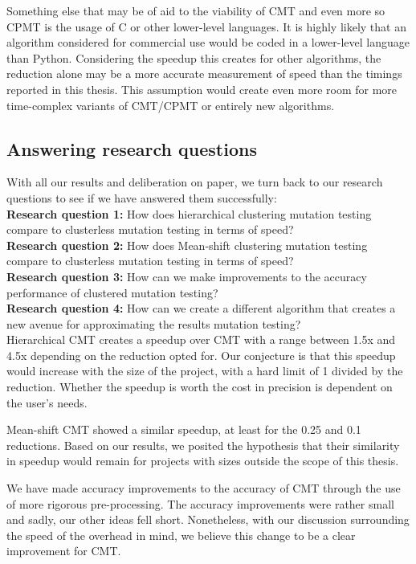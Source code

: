 \documentclass[twoside]{uva-inf-bachelor-thesis}
\begin{document}
Something else that may be of aid to the viability of CMT and even more so CPMT is the usage of C or other lower-level languages. It is highly likely that an algorithm considered for commercial use would be coded in a lower-level language than Python. Considering the speedup this creates for other algorithms, the reduction alone may be a more accurate measurement of speed than the timings reported in this thesis. This assumption would create even more room for more time-complex variants of CMT/CPMT or entirely new algorithms.

\subsection{Answering research questions}
With all our results and deliberation on paper, we turn back to our research questions to see if we have answered them successfully:\\
\textbf{Research question 1:} How does hierarchical clustering mutation testing compare to clusterless mutation testing in terms of speed?\\
\textbf{Research question 2:} How does Mean-shift clustering mutation testing compare to clusterless mutation testing in terms of speed?\\
\textbf{Research question 3:} How can we make improvements to the accuracy performance of clustered mutation testing?\\
\textbf{Research question 4:} How can we create a different algorithm that creates a new avenue for approximating the results mutation testing?\\
Hierarchical CMT creates a speedup over CMT with a range between 1.5x and 4.5x depending on the reduction opted for. Our conjecture is that this speedup would increase with the size of the project, with a hard limit of 1 divided by the reduction. Whether the speedup is worth the cost in precision is dependent on the user's needs. 

Mean-shift CMT showed a similar speedup, at least for the 0.25 and 0.1 reductions. Based on our results, we posited the hypothesis that their similarity in speedup would remain for projects with sizes outside the scope of this thesis.

We have made accuracy improvements to the accuracy of CMT through the use of more rigorous pre-processing. The accuracy improvements were rather small and sadly, our other ideas fell short. Nonetheless, with our discussion surrounding the speed of the overhead in mind, we believe this change to be a clear improvement for CMT.
\end{document}
